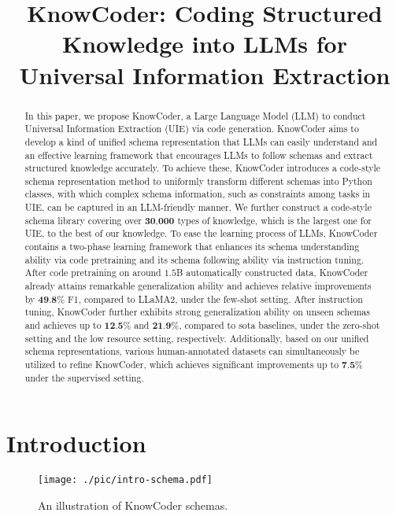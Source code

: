 \title{KnowCoder: Coding Structured Knowledge into LLMs for Universal Information Extraction}



\maketitle
\begin{abstract}

In this paper, we propose KnowCoder, a Large Language Model (LLM) to conduct Universal Information Extraction (UIE) via code generation. KnowCoder aims to develop a kind of unified schema representation that LLMs can easily understand and an effective learning framework that encourages LLMs to follow schemas and extract structured knowledge accurately. To achieve these, KnowCoder introduces a code-style schema representation method to uniformly transform different schemas into Python classes, with which complex schema information, such as constraints among tasks in UIE, can be captured in an LLM-friendly manner. We further construct a code-style schema library covering over $\textbf{30,000}$ types of knowledge, which is the largest one for UIE, to the best of our knowledge. To ease the learning process of LLMs, KnowCoder contains a two-phase learning framework that enhances its schema understanding ability via code pretraining and its schema following ability via instruction tuning. After code pretraining on around $1.5$B automatically constructed data, KnowCoder already attains remarkable generalization ability and achieves relative improvements by $\textbf{49.8\%}$ F1, compared to LLaMA2, under the few-shot setting. After instruction tuning, KnowCoder further exhibits strong generalization ability on unseen schemas and achieves up to $\textbf{12.5\%}$ and $\textbf{21.9\%}$, compared to sota baselines, under the zero-shot setting and the low resource setting, respectively. Additionally, based on our unified schema representations, various human-annotated datasets can simultaneously be utilized to refine KnowCoder, which achieves significant improvements up to $\textbf{7.5\%}$ under the supervised setting.

\end{abstract}

\section{Introduction}

\begin{figure}[tbp]  
    \vspace{8mm}
    \centering
    \texttt{[image: ./pic/intro-schema.pdf]}
    \caption{An illustration of KnowCoder schemas.} 
    \vspace{-4mm}
    \label{fig:illustration}
\end{figure}
  
